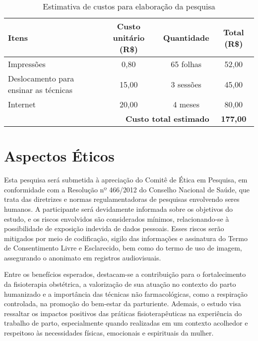 \documentclass[openright]{normas-utf-tex}
\begin{document}
\begin{table}[H]
    \centering
    \caption{Estimativa de custos para elaboração da pesquisa}
    \label{tab:orcamento}
    \begin{tabular}{p{5cm}ccc}
        \toprule
        Itens & Custo unitário (R\$) & Quantidade & Total (R\$) \\
        \midrule
        Impressões & 0,80 & 65 folhas & 52,00 \\
        Deslocamento para ensinar as técnicas & 15,00 & 3 sessões & 45,00 \\
        Internet & 20,00 & 4 meses & 80,00 \\
        \midrule
        \multicolumn{3}{r}{\textbf{Custo total estimado}} & \textbf{177,00} \\
        \bottomrule
    \end{tabular}
    \vspace{0.5em}
\end{table}

\section{Aspectos Éticos}
\label{sec:etica}

Esta pesquisa será submetida à apreciação do Comitê de Ética em Pesquisa, em conformidade com a Resolução nº 466/2012 do Conselho Nacional de Saúde, que trata das diretrizes e normas regulamentadoras de pesquisas envolvendo seres humanos. A participante será devidamente informada sobre os objetivos do estudo, e os riscos envolvidos são considerados mínimos, relacionando-se à possibilidade de exposição indevida de dados pessoais. Esses riscos serão mitigados por meio de codificação, sigilo das informações e assinatura do Termo de Consentimento Livre e Esclarecido, bem como do termo de uso de imagem, assegurando o anonimato em registros audiovisuais.

Entre os benefícios esperados, destacam-se a contribuição para o fortalecimento da fisioterapia obstétrica, a valorização de sua atuação no contexto do parto humanizado e a importância das técnicas não farmacológicas, como a respiração controlada, na promoção do bem-estar da parturiente. Ademais, o estudo visa ressaltar os impactos positivos das práticas fisioterapêuticas na experiência do trabalho de parto, especialmente quando realizadas em um contexto acolhedor e respeitoso às necessidades físicas, emocionais e espirituais da mulher.


\end{document}
